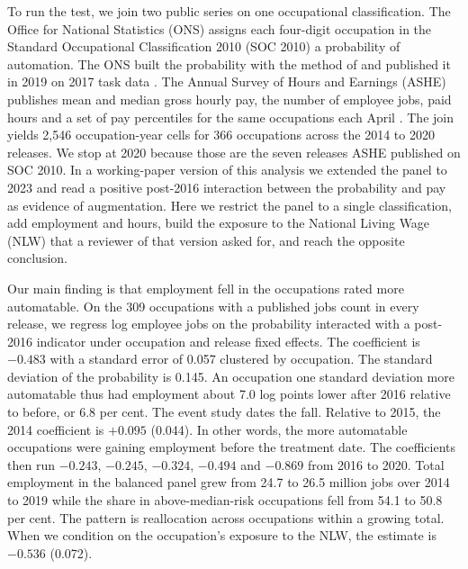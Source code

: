 \documentclass[12pt,leqno]{article}
\begin{document}
To run the test, we join two public series on one occupational classification. The Office for National Statistics (ONS) assigns each four-digit occupation in the Standard Occupational Classification 2010 (SOC 2010) a probability of automation. The ONS built the probability with the method of \citet{frey2017future} and published it in 2019 on 2017 task data \citep{ons2019automation}. The Annual Survey of Hours and Earnings (ASHE) publishes mean and median gross hourly pay, the number of employee jobs, paid hours and a set of pay percentiles for the same occupations each April \citep{ons2024ashe}. The join yields 2,546 occupation-year cells for 366 occupations across the 2014 to 2020 releases. We stop at 2020 because those are the seven releases ASHE published on SOC 2010. In a working-paper version of this analysis we extended the panel to 2023 and read a positive post-2016 interaction between the probability and pay as evidence of augmentation. Here we restrict the panel to a single classification, add employment and hours, build the exposure to the National Living Wage (NLW) that a reviewer of that version asked for, and reach the opposite conclusion.

Our main finding is that employment fell in the occupations rated more automatable. On the 309 occupations with a published jobs count in every release, we regress log employee jobs on the probability interacted with a post-2016 indicator under occupation and release fixed effects. The coefficient is $-0.483$ with a standard error of 0.057 clustered by occupation. The standard deviation of the probability is 0.145. An occupation one standard deviation more automatable thus had employment about 7.0 log points lower after 2016 relative to before, or 6.8 per cent. The event study dates the fall. Relative to 2015, the 2014 coefficient is $+0.095$ (0.044). In other words, the more automatable occupations were gaining employment before the treatment date. The coefficients then run $-0.243$, $-0.245$, $-0.324$, $-0.494$ and $-0.869$ from 2016 to 2020. Total employment in the balanced panel grew from 24.7 to 26.5 million jobs over 2014 to 2019 while the share in above-median-risk occupations fell from 54.1 to 50.8 per cent. The pattern is reallocation across occupations within a growing total. When we condition on the occupation's exposure to the NLW, the estimate is $-0.536$ (0.072).
\end{document}
